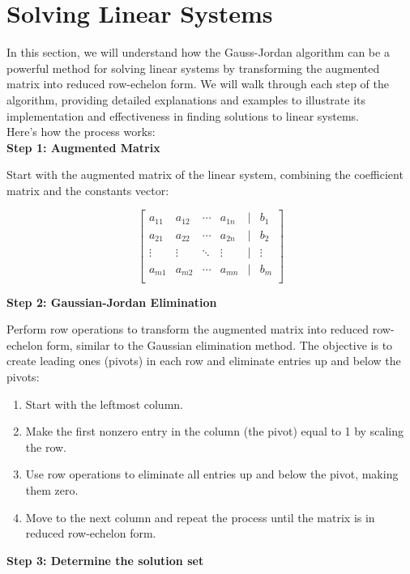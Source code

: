 \section{Solving Linear Systems}

In this section, we will understand how the Gauss-Jordan algorithm can be a powerful method for solving linear systems by transforming the augmented matrix into reduced row-echelon form. We will walk through each step of the algorithm, providing detailed explanations and examples to illustrate its implementation and effectiveness in finding solutions to linear systems.
\\

Here's how the process works:
\\

\textbf{Step 1: Augmented Matrix}

Start with the augmented matrix of the linear system, combining the coefficient matrix and the constants vector:

\[
\begin{bmatrix}
a_{11} & a_{12} & \cdots & a_{1n} & | & b_1 \\
a_{21} & a_{22} & \cdots & a_{2n} & | & b_2 \\
\vdots & \vdots & \ddots & \vdots & | & \vdots \\
a_{m1} & a_{m2} & \cdots & a_{mn} & | & b_m \\
\end{bmatrix}
\]

\textbf{Step 2: Gaussian-Jordan Elimination}

Perform row operations to transform the augmented matrix into reduced row-echelon form, similar to the Gaussian elimination method. The objective is to create leading ones (pivots) in each row and eliminate entries up and below the pivots:

\begin{enumerate}
    \item Start with the leftmost column.
    \item Make the first nonzero entry in the column (the pivot) equal to 1 by scaling the row.
    \item Use row operations to eliminate all entries up and below the pivot, making them zero.
    \item Move to the next column and repeat the process until the matrix is in reduced row-echelon form.
\end{enumerate}

\textbf{Step 3: Determine the solution set}

